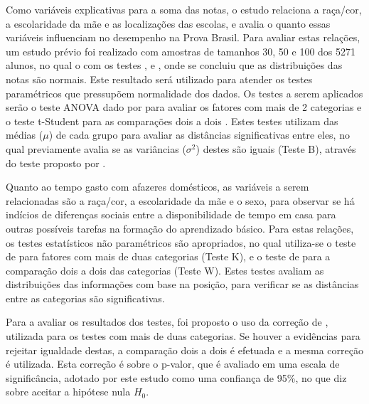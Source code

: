 Como variáveis explicativas para a soma das notas, o estudo relaciona a raça/cor, a escolaridade da mãe e as localizações das escolas,
e avalia o quanto essas variáveis influenciam no desempenho na Prova Brasil. Para avaliar estas relações, um estudo prévio foi realizado
com amostras de tamanhos 30, 50 e 100 dos 5271 alunos, no qual o com os testes , 
e , onde se concluiu que as distribuições das notas são normais. Este resultado será utilizado para atender
os testes paramétricos que pressupõem normalidade dos dados. Os testes a serem aplicados serão o teste ANOVA dado por  para 
avaliar os fatores com mais de 2 categorias e o teste t-Student para as comparações dois a dois \cite{o1908student}.
Estes testes utilizam das médias ($\mu$) de cada grupo para avaliar as distâncias significativas entre eles, no qual previamente avalia se as
variâncias ($\sigma^2$) destes são iguais (Teste B), através do teste proposto por .

Quanto ao tempo gasto com afazeres domésticos, as variáveis a serem relacionadas são a raça/cor, a escolaridade da mãe
e o sexo, para observar se há indícios de diferenças sociais entre a disponibilidade de tempo em casa para outras possíveis 
tarefas na formação do aprendizado básico. Para estas relações, os testes estatísticos não paramétricos são apropriados,
no qual utiliza-se o teste de  para fatores com mais de duas categorias (Teste K), e o
teste de  para a comparação dois a dois das categorias (Teste W). Estes testes avaliam as
distribuições das informações com base na posição, para verificar se as distâncias entre as categorias são significativas.


Para a avaliar os resultados dos testes, foi proposto o uso da correção de , utilizada para os 
testes com mais de duas categorias. Se houver a evidências para rejeitar igualdade destas, a comparação dois a dois é efetuada e a mesma correção
é utilizada. Esta correção é sobre o p-valor, que é avaliado em uma escala de significância, adotado por este estudo
como uma confiança de 95\%, no que diz sobre aceitar a hipótese nula $H_0$.